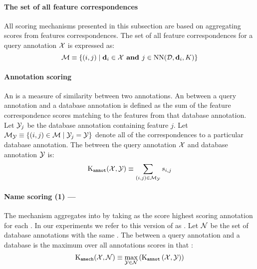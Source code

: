         \paragraph{The set of all feature correspondences}
        All scoring mechanisms presented in this subsection are based on aggregating scores from features
          correspondences.
        The set of all feature correspondences for a query annotation $\mathcal{X}$ is expressed as:
        \begin{equation}
            \mathcal{M} \equiv \{(i, j) \mid \mathbf{d}_i \in \mathcal{X} \textbf{ and } j \in \operatorname{NN}(\mathcal{D}, \mathbf{d}_i, K)\}
        \end{equation}

        \paragraph{Annotation scoring}
            An \annotscore{} is a measure of similarity between two annotations.
            An \annotscore{} between a query annotation and a database annotation is defined as the sum of the
              feature correspondence scores matching to the features from that database annotation.
            Let $\mathcal{Y}_j$ be the database annotation containing feature $j$.
            Let
            $\mathcal{M}_{\mathcal{Y}} \equiv \left\{(i, j) \in \mathcal{M} \mid \mathcal{Y}_j = \mathcal{Y}\right\}$
            denote all of the correspondences to a particular database annotation.
            The \annotscore{} between the query annotation $\mathcal{X}$ and database annotation $\mathcal{Y}$ is:
            \begin{equation}
                \operatorname{K_{\tt annot}}(\mathcal{X}, \mathcal{Y}) \equiv \sum_{(i, j) \in \mathcal{M}_{\mathcal{Y}}} s_{i, j}
            \end{equation}

        \paragraph{Name scoring (1) --- \csumprefix{}} %

            The \cscoring{} mechanism aggregates \annotscores{} into \namescores{} by taking as the score highest
              scoring annotation for each \name{}.
            In our experiments we refer to this version of \namescoring{} as \csum{}.
            Let $\mathcal{N}$ be the set of database annotations with the same \name{}.
            The \cscore{} between a query annotation and a database \name{} is the maximum over all annotations
              scores in that \name{}:
            \begin{equation}
                \operatorname{K_{{\tt{amech}}}}(\mathcal{X}, \mathcal{N}) 
                \equiv
                \max_{\mathcal{Y} \in \mathcal{N}}
                \left(
                    \operatorname{K_{\tt annot}}\left(\mathcal{X}, \mathcal{Y}\right)
                \right)
            \end{equation}

